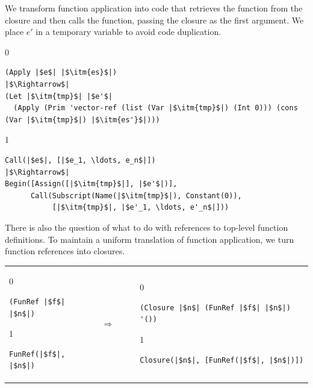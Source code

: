 \documentclass[7x10]{TimesAPriori_MIT}%
\def\racketEd{0}
\def\pythonEd{1}
\def\edition{1}
\newcommand{\pythonColor}[0]{}
\numberwithin{theorem}{chapter}
\numberwithin{definition}{chapter}
\numberwithin{equation}{chapter}
\begin{document}
We transform function application into code that retrieves the
function from the closure and then calls the function, passing the
closure as the first argument. We place $e'$ in a temporary variable
to avoid code duplication.
\begin{center}
\begin{minipage}{\textwidth}
{\if\edition\racketEd
\begin{lstlisting}
(Apply |$e$| |$\itm{es}$|)
|$\Rightarrow$|
(Let |$\itm{tmp}$| |$e'$|
  (Apply (Prim 'vector-ref (list (Var |$\itm{tmp}$|) (Int 0))) (cons (Var |$\itm{tmp}$|) |$\itm{es'}$|)))
\end{lstlisting}
\fi}
%
{\if\edition\pythonEd\pythonColor
\begin{lstlisting}
Call(|$e$|, [|$e_1, \ldots, e_n$|])
|$\Rightarrow$|
Begin([Assign([|$\itm{tmp}$|], |$e'$|)],
      Call(Subscript(Name(|$\itm{tmp}$|), Constant(0)),
           [|$\itm{tmp}$|, |$e'_1, \ldots, e'_n$|]))
\end{lstlisting}
\fi}
\end{minipage}
\end{center}

There is also the question of what to do with references to top-level
function definitions. To maintain a uniform translation of function
application, we turn function references into closures.

\begin{tabular}{lll}
\begin{minipage}{0.2\textwidth}
{\if\edition\racketEd
\begin{lstlisting}
(FunRef |$f$| |$n$|)
\end{lstlisting}
\fi}
{\if\edition\pythonEd\pythonColor
\begin{lstlisting}
FunRef(|$f$|, |$n$|)
\end{lstlisting}
\fi}
\end{minipage}
&
$\Rightarrow\qquad$
&
\begin{minipage}{0.5\textwidth}
{\if\edition\racketEd
\begin{lstlisting}
(Closure |$n$| (FunRef |$f$| |$n$|) '())
\end{lstlisting}
\fi}
{\if\edition\pythonEd\pythonColor
\begin{lstlisting}
Closure(|$n$|, [FunRef(|$f$|, |$n$|)])
\end{lstlisting}
\fi}
\end{minipage}
\end{tabular}  \\
\end{document}
